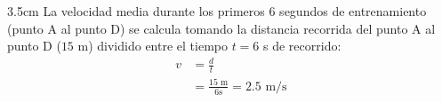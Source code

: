 {\begin{minipage}[t]{0.65\linewidth}
\begin{parts}
                    \begin{solutionbox}{3.5cm}\footnotesize%
                         La velocidad media durante los primeros 6 segundos de entrenamiento (punto A al punto D) se calcula
                         tomando la distancia recorrida del punto A al punto D ($15$ m) dividido entre el tiempo $t=6$ s de recorrido:
                         \begin{align}
                              v & =\frac{d}{t}                                   \\
                                & =\frac{15\text{ m}}{6\text{s}} =2.5\text{ m/s}
                         \end{align}
                    \end{solutionbox}



               \end{parts}
          \end{minipage}
     }

